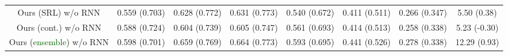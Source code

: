 \documentclass[11pt]{article}
\newcommand{\fone}{$\text{F}_1$\xspace}
\newcommand{\imrc}{iMRC\xspace}
\begin{document}
\begin{table*}
\begin{tabular}{c|ccc|ccc|c}
        Ours (SRL) w/o RNN                              & 0.559 \color{blue}(0.703) & 0.628 \color{blue}(0.772) & 0.631 \color{blue}(0.773) & 0.540 \color{blue}(0.672) & 0.411 \color{blue}(0.511) & 0.266 \color{blue}(0.347) & 5.50 \color{blue}(0.38) \\
        Ours (cont.) w/o RNN                            & 0.588 \color{blue}(0.724) & 0.604 \color{blue}(0.739) & 0.605 \color{blue}(0.747) & 0.561 \color{blue}(0.693) & 0.414 \color{blue}(0.513) & 0.258 \color{blue}(0.338) & 5.23 \color{blue}(-0.30) \\
        Ours (\textcolor{darkgreen}{ensemble}) w/o RNN  & 0.598 \color{blue}(0.701) & 0.659 \color{blue}(0.769) & 0.664 \color{blue}(0.773) & 0.593 \color{blue}(0.695) & 0.441 \color{blue}(0.526) & 0.278 \color{blue}(0.338) & 12.29 \color{blue}(0.93) \\
        \bottomrule
    \end{tabular}
    \caption{\#Memory slot = 1. Testing \fone in \textbf{black} and sufficient information rewards in \textcolor{blue}{\textbf{blue}}. \%RI represents relative improvement over \imrc on corresponding metric, across settings.}
    \label{tab:result_table_full_slot_1}
\end{table*}
\end{document}
